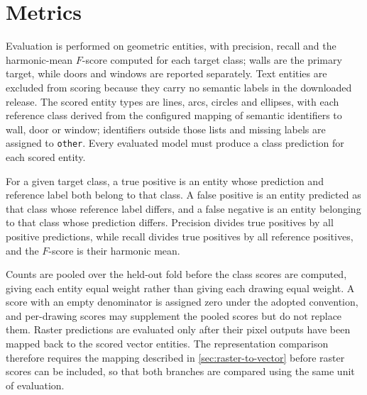 \section{Metrics}
\label{sec:metrics}
Evaluation is performed on geometric entities, with precision, recall and the
harmonic-mean \(F\)-score computed for each target class; walls are the primary
target, while doors and windows are reported separately.
Text entities are excluded from scoring because they carry no semantic labels in
the downloaded release.
The scored entity types are lines, arcs, circles and ellipses, with each reference
class derived from the configured mapping of semantic identifiers
to wall, door or window; identifiers outside those lists and missing labels are
assigned to \texttt{other}.
Every evaluated model must produce a class prediction for each scored entity.

For a given target class, a true positive is an entity whose prediction and
reference label both belong to that class.
A false positive is an entity predicted as that class whose reference label differs,
and a false negative is an entity belonging to that class whose prediction differs.
Precision divides true positives by all positive predictions, while recall divides
true positives by all reference positives, and the \(F\)-score is their harmonic mean.

Counts are pooled over the held-out fold before the class scores are computed,
giving each entity equal weight rather than giving each drawing equal weight.
A score with an empty denominator is assigned zero under the adopted convention,
and per-drawing scores may supplement the pooled scores but do not replace them.
Raster predictions are evaluated only after their pixel outputs have been mapped
back to the scored vector entities.
The representation comparison therefore requires the mapping described in
\cref{sec:raster-to-vector} before raster scores can be included, so that both
branches are compared using the same unit of evaluation.

